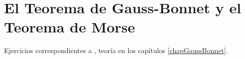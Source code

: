 \newpage
\section{El Teorema de Gauss-Bonnet y el Teorema de Morse}

Ejercicios correspondientes a \cite[Capítulo 6]{doCarmo94}, teoría en los capítulos \ref{chapGaussBonnet}.

